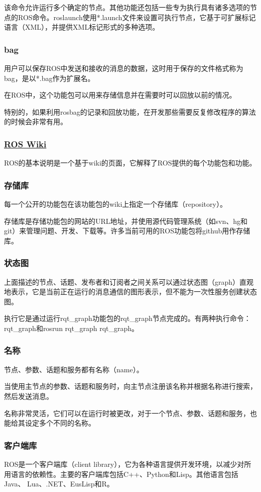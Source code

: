 \documentclass[geye,green,kindle,cn]{elegantnote}
\begin{document}
该命令允许运行多个确定的节点。其他功能还包括一些专为执行具有诸多选项的节点的ROS命令。roslaunch使用*.launch文件来设置可执行节点，它基于可扩展标记语言（XML），并提供XML标记形式的多种选项。
\subsubsection{bag}
用户可以保存ROS中发送和接收的消息的数据，这时用于保存的文件格式称为bag，是以*.bag作为扩展名。

在ROS中，这个功能包可以用来存储信息并在需要时可以回放以前的情况。

特别的，如果利用rosbag的记录和回放功能，在开发那些需要反复修改程序的算法的时候会非常有用。
\subsubsection{\href{http://wiki.ros.org/}{ROS Wiki}}
ROS的基本说明是一个基于wiki的页面，它解释了ROS提供的每个功能包和功能。
\subsubsection{存储库}
每一个公开的功能包在该功能包的wiki上指定一个存储库（repository）。

存储库是存储功能包的网站的URL地址，并使用源代码管理系统（如svn、hg和git）来管理问题、开发、下载等。许多当前可用的ROS功能包将github用作存储库。
\subsubsection{状态图}
上面描述的节点、话题、发布者和订阅者之间关系可以通过状态图（graph）直观地表示，它是当前正在运行的消息通信的图形表示，但不能为一次性服务创建状态图。

执行它是通过运行rqt\_graph功能包的rqt\_graph节点完成的。有两种执行命令：rqt\_graph和rosrun rqt\_graph rqt\_graph。
\subsubsection{名称}
节点、参数、话题和服务都有名称（name）。

当使用主节点的参数、话题和服务时，向主节点注册该名称并根据名称进行搜索，然后发送消息。

名称非常灵活，它们可以在运行时被更改，对于一个节点、参数、话题和服务，也能给其设定多个不同的名称。
\subsubsection{客户端库}
ROS是一个客户端库（client library），它为各种语言提供开发环境，以减少对所用语言的依赖性。主要的客户端库包括C++、Python和Lisp。其他语言包括Java、 Lua、.NET、EusLisp和R。
\end{document}

